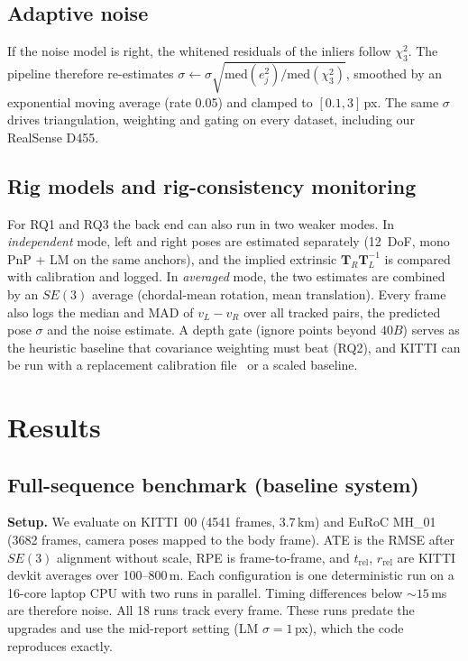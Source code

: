 \documentclass[11pt,a4paper]{article}
\newcommand{\T}{\mathbf{T}}
\begin{document}
\subsection{Adaptive noise}\label{sec:noise}
If the noise model is right, the whitened residuals of the inliers follow $\chi^2_3$. The pipeline therefore re-estimates $\sigma \leftarrow \sigma\sqrt{\mathrm{med}(e_j^2)/\mathrm{med}(\chi^2_3)}$, smoothed by an exponential moving average (rate 0.05) and clamped to $[0.1, 3]$\,px. The same $\sigma$ drives triangulation, weighting and gating on every dataset, including our RealSense D455.

\subsection{Rig models and rig-consistency monitoring}\label{sec:rig}
For RQ1 and RQ3 the back end can also run in two weaker modes. In \emph{independent} mode, left and right poses are estimated separately (12~DoF, mono PnP + LM on the same anchors), and the implied extrinsic $\T_R\T_L^{-1}$ is compared with calibration and logged. In \emph{averaged} mode, the two estimates are combined by an $SE(3)$ average (chordal-mean rotation, mean translation). Every frame also logs the median and MAD of $v_L - v_R$ over all tracked pairs, the predicted pose $\sigma$ and the noise estimate. A depth gate (ignore points beyond $40B$) serves as the heuristic baseline that covariance weighting must beat (RQ2), and KITTI can be run with a replacement calibration file~\cite{recalib} or a scaled baseline.

\section{Results}\label{sec:results}
\subsection{Full-sequence benchmark (baseline system)}
\textbf{Setup.} We evaluate on KITTI~00 (4541 frames, 3.7\,km) and EuRoC MH\_01 (3682 frames, camera poses mapped to the body frame). ATE is the RMSE after $SE(3)$ alignment without scale, RPE is frame-to-frame, and $t_\mathrm{rel}$, $r_\mathrm{rel}$ are KITTI devkit averages over 100--800\,m. Each configuration is one deterministic run on a 16-core laptop CPU with two runs in parallel. Timing differences below ${\sim}15$\,ms are therefore noise. All 18 runs track every frame. These runs predate the upgrades and use the mid-report setting (LM $\sigma = 1$\,px), which the code reproduces exactly.
\end{document}
